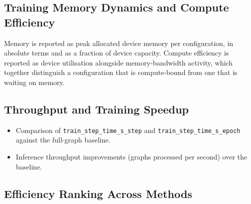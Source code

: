 


\subsection{Training Memory Dynamics and Compute Efficiency}
\label{sec:results:rq2:memory}
Memory is reported as peak allocated device memory per configuration, in absolute terms and
as a fraction of device capacity. Compute efficiency is reported as device utilisation
alongside memory-bandwidth activity, which together distinguish a configuration that is
compute-bound from one that is waiting on memory.


\subsection{Throughput and Training Speedup}
\label{sec:results:rq2:throughput}
\begin{itemize}
    \item Comparison of \texttt{train\_step\_time\_s\_step} and \texttt{train\_step\_time\_s\_epoch} against the full-graph baseline.
    \item Inference throughput improvements (graphs processed per second) over the baseline.
\end{itemize}


\subsection{Efficiency Ranking Across Methods}
\label{sec:results:rq2:ranking}


